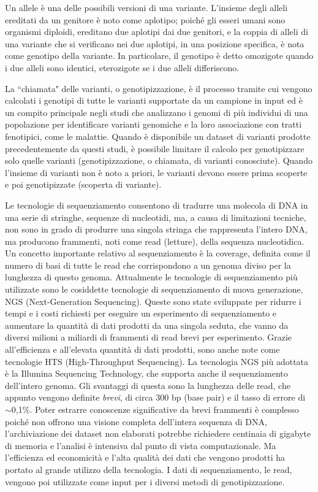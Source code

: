 \documentclass[../main.tex]{subfiles}
\begin{document}
Un allele è una delle possibili versioni di una variante. L'insieme degli alleli ereditati da un genitore è noto come aplotipo; poiché gli esseri umani sono organismi diploidi, ereditano due aplotipi dai due genitori, e la coppia di alleli di una variante che si verificano nei due aplotipi, in una posizione specifica, è nota come genotipo della variante. In particolare, il genotipo è detto omozigote quando i due alleli sono identici, eterozigote se i due alleli differiscono. 

La ``chiamata" delle varianti, o genotipizzazione, è il processo tramite cui vengono calcolati i genotipi di tutte le varianti supportate da un campione in input ed è un compito principale negli studi che analizzano i genomi di più individui di una popolazione per identificare varianti genomiche e la loro associazione con tratti fenotipici, come le malattie. Quando è disponibile un dataset di varianti prodotte precedentemente da questi studi, è possibile limitare il calcolo per genotipizzare solo quelle varianti (genotipizzazione, o chiamata, di varianti conosciute). Quando l'insieme di varianti non è noto a priori, le varianti devono essere prima scoperte e poi genotipizzate (scoperta di variante).

Le tecnologie di sequenziamento consentono di tradurre una molecola di DNA in una serie di stringhe, sequenze di nucleotidi, ma, a causa di limitazioni tecniche, non sono in grado di produrre una singola stringa che rappresenta l'intero DNA, ma producono frammenti, noti come read (letture), della sequenza nucleotidica. Un concetto importante relativo al sequenziamento è la coverage, definita come il numero di basi di tutte le read che corrispondono a un genoma diviso per la lunghezza di questo genoma. Attualmente le tecnologie di sequenziamento più utilizzate sono le cosiddette tecnologie di sequenziamento di nuova generazione, NGS (Next-Generation Sequencing). Queste sono state sviluppate per ridurre i tempi e i costi richiesti per eseguire un esperimento di sequenziamento e aumentare la quantità di dati prodotti da una singola seduta, che vanno da diversi milioni a miliardi di frammenti di read brevi per esperimento. Grazie all'efficienza e all'elevata quantità di dati prodotti, sono anche note come tecnologie HTS (High-Throughput Sequencing). La tecnologia NGS più adottata è la Illumina Sequencing Technology, che  supporta anche il sequenziamento dell'intero genoma. Gli svantaggi di questa sono la lunghezza delle read, che appunto vengono definite \textit{brevi}, di circa 300 bp (base pair) e il tasso di errore di  $\sim$0,1\%. Poter estrarre conoscenze significative da brevi frammenti è complesso poiché non offrono una visione completa dell'intera sequenza di DNA, l'archiviazione dei dataset non elaborati potrebbe richiedere centinaia di gigabyte di memoria e l'analisi è intensiva dal punto di vista computazionale. Ma l'efficienza ed economicità e l'alta qualità dei dati che vengono prodotti ha portato al grande utilizzo della tecnologia. I dati di sequenziamento, le read, vengono poi utilizzate come input per i diversi metodi di genotipizzazione.
\end{document}
